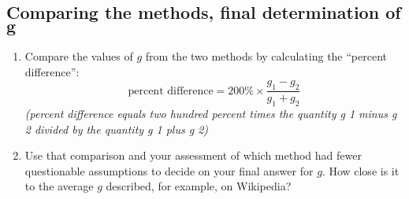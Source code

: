 \subsection{Comparing the methods, final determination of $\bm{g}$}

\begin{enumerate}
	\item Compare the values of $g$ from the two methods by calculating the ``percent difference'':
	\begin{equation}
	 \textrm{percent difference} = 200\% \times \frac{g_1 - g_2}{g_1 + g_2}
	\end{equation}
	\textit{(percent difference equals two hundred percent times the quantity g 1 minus g 2 divided by the quantity g 1 plus g 2)}\newline
	
	\item Use that comparison and your assessment of which method had fewer questionable assumptions to decide on your final answer for $g$. How close is it to the average $g$ described, for example, on Wikipedia?
\end{enumerate}